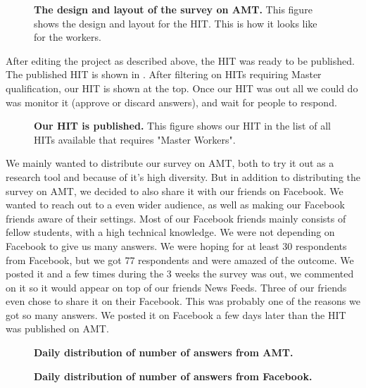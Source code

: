 \begin{figure}[h!]
\centering
{}
\caption[The design and layout of the survey on AMT]{\textbf{The design and layout of the survey on AMT.} This figure shows the design and layout for the HIT. This is how it looks like for the workers.} 
\label{fig:amtlayout}
\end{figure}

After editing the project as described above, the HIT was ready to be published. The published HIT is shown in . After filtering on HITs requiring Master qualification, our HIT is shown at the top. 
Once our HIT was out all we could do was monitor it (approve or discard answers), and wait for people to respond. 

\begin{figure}[h!]
\centering
{}
\caption[Our HIT is published]{\textbf{Our HIT is published.} This figure shows our HIT in the list of all HITs available that requires "Master Workers".} 
\label{fig:hitout}
\end{figure}

We mainly wanted to distribute our survey on AMT, both to try it out as a research tool and because of it's high diversity. But in addition to distributing the survey on AMT, we decided to also share it with our friends on Facebook. We wanted to reach out to a even wider audience, as well as making our Facebook  friends aware of their settings. Most of our Facebook friends mainly consists of fellow students, with a high technical knowledge. We were not depending on Facebook to give us many answers. We were hoping for at least 30 respondents from Facebook, but we got 77 respondents and were amazed of the outcome. We posted it and a few times during the 3 weeks the survey was out, we commented on it so it would appear on top of our friends News Feeds. Three of our friends even chose to share it on their Facebook. This was probably one of the reasons we got so many answers. We posted it on Facebook a few days later than the HIT was published on AMT.  

\begin{figure}[h!]
\centering
{}
\caption[Daily distribution of number of answers from AMT]{\textbf{Daily distribution of number of answers from AMT.}} 
\label{fig:answersamt}
\end{figure}

\begin{figure}[h!]
\centering
{}
\caption[Daily distribution of number of answers from Facebook]{\textbf{Daily distribution of number of answers from Facebook.}} 
\label{fig:answersfacebook}
\end{figure}

